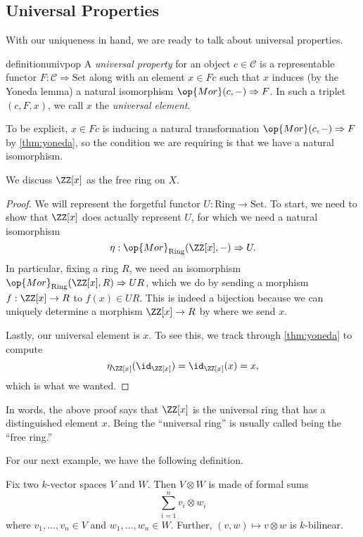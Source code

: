 \documentclass[../notes.tex]{subfiles}
\begin{document}
\subsection{Universal Properties}
With our uniqueness in hand, we are ready to talk about universal properties.
\begin{restatable}{definition}{univpop}
	A \textit{universal property} for an object $c\in\mathcal C$ is a representable functor $F:\mathcal C\Rightarrow\mathrm{Set}$ along with an element $x\in Fc$ such that $x$ induces (by the Yoneda lemma) a natural isomorphism $\op{Mor}(c,-)\Rightarrow F$. In such a triplet $(c,F,x)$, we call $x$ the \textit{universal element}.
\end{restatable}
\noindent To be explicit, $x\in Fc$ is inducing a natural transformation $\op{Mor}(c,-)\Rightarrow F$ by \autoref{thm:yoneda}, so the condition we are requiring is that we have a natural isomorphism.
\begin{exe}
	We discuss $\ZZ[x]$ as the free ring on $X$.
\end{exe}
\begin{proof}
	We will represent the forgetful functor $U:\mathrm{Ring}\to\mathrm{Set}$. To start, we need to show that $\ZZ[x]$ does actually represent $U$, for which we need a natural isomorphism
	\[\eta:\op{Mor}_{\mathrm{Ring}}(\ZZ[x],-)\Rightarrow U.\]
	In particular, fixing a ring $R$, we need an isomorphism $\op{Mor}_{\mathrm{Ring}}(\ZZ[x],R)\Rightarrow UR$, which we do by sending a morphism $f:\ZZ[x]\to R$ to $f(x)\in UR$. This is indeed a bijection because we can uniquely determine a morphism $\ZZ[x]\to R$ by where we send $x$.
	
	Lastly, our universal element is $x$. To see this, we track through \autoref{thm:yoneda} to compute
	\[\eta_{\ZZ[x]}(\id_{\ZZ[x]})=\id_{\ZZ[x]}(x)=x,\]
	which is what we wanted.
\end{proof}
\begin{remark}
	In words, the above proof says that $\ZZ[x]$ is the universal ring that has a distinguished element $x$. Being the ``universal ring'' is usually called being the ``free ring.''
\end{remark}
For our next example, we have the following definition.
\begin{definition}
	Fix two $k$-vector spaces $V$ and $W$. Then $V\otimes W$ is made of formal sums
	\[\sum_{i=1}^nv_i\otimes w_i\]
	where $v_1,\ldots,v_n\in V$ and $w_1,\ldots,w_n\in W$. Further, $(v,w)\mapsto v\otimes w$ is $k$-bilinear.
\end{definition}
\end{document}
